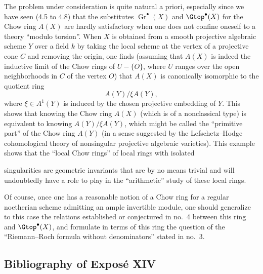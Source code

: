 The problem under consideration is quite natural a priori, especially since
we have seen (4.5 to 4.8) that the substitutes
$\operatorname{Gr}^\bullet(X)$ and $\Gtop^\bullet(X)$ for the Chow ring
$A(X)$ are hardly satisfactory when one does not confine oneself to a theory
``modulo torsion''. When $X$ is obtained from a smooth projective algebraic
scheme $Y$ over a field $k$ by taking the local scheme at the vertex of a
projective cone $C$ and removing the origin, one finds (assuming that $A(X)$
is indeed the inductive limit of the Chow rings of $U-\{O\}$, where $U$
ranges over the open neighborhoods in $C$ of the vertex $O$) that $A(X)$ is
canonically isomorphic to the quotient ring
\[
 A(Y)/\xi A(Y),
\]
where $\xi\in A^1(Y)$ is induced by the chosen projective embedding of $Y$.
This shows that knowing the Chow ring $A(X)$ (which is of a nonclassical
type) is equivalent to knowing $A(Y)/\xi A(Y)$, which might be called the
``primitive part'' of the Chow ring $A(Y)$ (in a sense suggested by the
Lefschetz--Hodge cohomological theory of nonsingular projective algebraic
varieties). This example shows that the ``local Chow rings'' of local rings
with isolated

singularities are geometric invariants that are by no means trivial and will
undoubtedly have a role to play in the ``arithmetic'' study of these local
rings.

Of course, once one has a reasonable notion of a Chow ring for a regular
noetherian scheme admitting an ample invertible module, one should
generalize to this case the relations established or conjectured in no.~4
between this ring and $\Gtop^\bullet(X)$, and formulate in terms of this ring
the question of the ``Riemann--Roch formula without denominators'' stated in
no.~3.

\subsection*{Bibliography of Expos\'e XIV}

